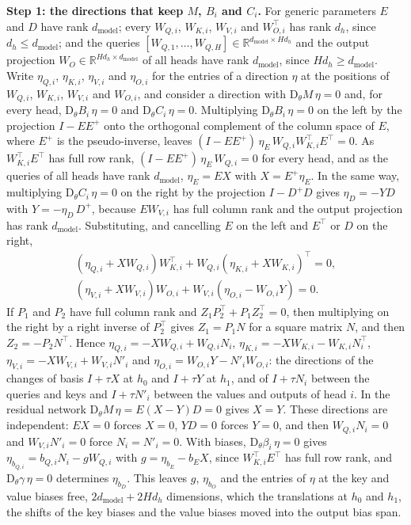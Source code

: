 \documentclass[10pt]{article}
\theoremstyle{definition}
\theoremstyle{remark}
\newcommand{\R}{\mathbb{R}}
\newcommand{\dm}{d_{\mathrm{model}}}
\newcommand{\Der}{\mathrm{D}}
\newcommand{\para}[1]{\smallskip\noindent\textbf{#1}\hspace{0.5em}}
\begin{document}
\para{Step 1: the directions that keep $M$, $B_i$ and $C_i$.} For generic parameters $E$ and $D$ have rank $\dm$; every $W_{Q,i}$, $W_{K,i}$, $W_{V,i}$ and $W_{O,i}^\top$ has rank $d_h$, since $d_h \le \dm$; and the queries $[W_{Q,1}, \dots, W_{Q,H}] \in \R^{\dm\times Hd_h}$ and the output projection $W_O \in \R^{Hd_h\times\dm}$ of all heads have rank $\dm$, since $Hd_h \ge \dm$. Write $\eta_{Q,i}$, $\eta_{K,i}$, $\eta_{V,i}$ and $\eta_{O,i}$ for the entries of a direction $\eta$ at the positions of $W_{Q,i}$, $W_{K,i}$, $W_{V,i}$ and $W_{O,i}$, and consider a direction with $\Der_\theta M\,\eta = 0$ and, for every head, $\Der_\theta B_i\,\eta = 0$ and $\Der_\theta C_i\,\eta = 0$. Multiplying $\Der_\theta B_i\,\eta = 0$ on the left by the projection $I - EE^+$ onto the orthogonal complement of the column space of $E$, where $E^+$ is the pseudo-inverse, leaves $(I - EE^+)\,\eta_E\,W_{Q,i}W_{K,i}^\top E^\top = 0$. As $W_{K,i}^\top E^\top$ has full row rank, $(I - EE^+)\,\eta_E\,W_{Q,i} = 0$ for every head, and as the queries of all heads have rank $\dm$, $\eta_E = EX$ with $X = E^+\eta_E$. In the same way, multiplying $\Der_\theta C_i\,\eta = 0$ on the right by the projection $I - D^+D$ gives $\eta_D = -YD$ with $Y = -\eta_D\,D^+$, because $EW_{V,i}$ has full column rank and the output projection has rank $\dm$. Substituting, and cancelling $E$ on the left and $E^\top$ or $D$ on the right,
\begin{gather*}
(\eta_{Q,i} + XW_{Q,i})W_{K,i}^\top + W_{Q,i}(\eta_{K,i} + XW_{K,i})^\top = 0,\\
(\eta_{V,i} + XW_{V,i})W_{O,i} + W_{V,i}(\eta_{O,i} - W_{O,i}Y) = 0.
\end{gather*}
If $P_1$ and $P_2$ have full column rank and $Z_1P_2^\top + P_1Z_2^\top = 0$, then multiplying on the right by a right inverse of $P_2^\top$ gives $Z_1 = P_1N$ for a square matrix $N$, and then $Z_2 = -P_2N^\top$. Hence $\eta_{Q,i} = -XW_{Q,i} + W_{Q,i}N_i$, $\eta_{K,i} = -XW_{K,i} - W_{K,i}N_i^\top$, $\eta_{V,i} = -XW_{V,i} + W_{V,i}N'_i$ and $\eta_{O,i} = W_{O,i}Y - N'_iW_{O,i}$: the directions of the changes of basis $I + \tau X$ at $h_0$ and $I + \tau Y$ at $h_1$, and of $I + \tau N_i$ between the queries and keys and $I + \tau N'_i$ between the values and outputs of head $i$. In the residual network $\Der_\theta M\,\eta = E(X - Y)D = 0$ gives $X = Y$. These directions are independent: $EX = 0$ forces $X = 0$, $YD = 0$ forces $Y = 0$, and then $W_{Q,i}N_i = 0$ and $W_{V,i}N'_i = 0$ force $N_i = N'_i = 0$. With biases, $\Der_\theta\beta_i\,\eta = 0$ gives $\eta_{b_{Q,i}} = b_{Q,i}N_i - gW_{Q,i}$ with $g = \eta_{b_E} - b_EX$, since $W_{K,i}^\top E^\top$ has full row rank, and $\Der_\theta\gamma\,\eta = 0$ determines $\eta_{b_D}$. This leaves $g$, $\eta_{b_O}$ and the entries of $\eta$ at the key and value biases free, $2\dm + 2Hd_h$ dimensions, which the translations at $h_0$ and $h_1$, the shifts of the key biases and the value biases moved into the output bias span.
\end{document}
